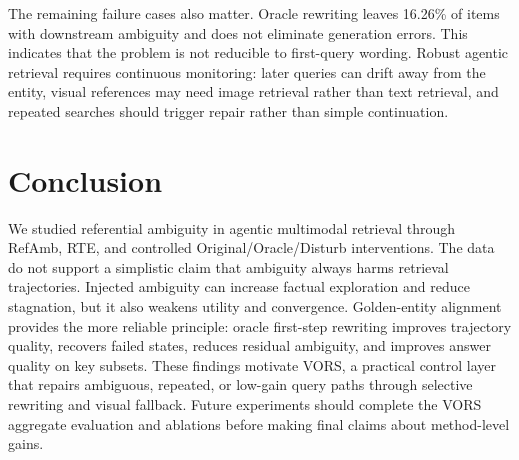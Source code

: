 \documentclass{article}
\begin{document}
The remaining failure cases also matter.
Oracle rewriting leaves 16.26\% of items with downstream ambiguity and does not eliminate generation errors.
This indicates that the problem is not reducible to first-query wording.
Robust agentic retrieval requires continuous monitoring: later queries can drift away from the entity, visual references may need image retrieval rather than text retrieval, and repeated searches should trigger repair rather than simple continuation.

\section{Conclusion}
We studied referential ambiguity in agentic multimodal retrieval through RefAmb, RTE, and controlled Original/Oracle/Disturb interventions.
The data do not support a simplistic claim that ambiguity always harms retrieval trajectories.
Injected ambiguity can increase factual exploration and reduce stagnation, but it also weakens utility and convergence.
Golden-entity alignment provides the more reliable principle: oracle first-step rewriting improves trajectory quality, recovers failed states, reduces residual ambiguity, and improves answer quality on key subsets.
These findings motivate VORS, a practical control layer that repairs ambiguous, repeated, or low-gain query paths through selective rewriting and visual fallback.
Future experiments should complete the VORS aggregate evaluation and ablations before making final claims about method-level gains.



\end{document}
